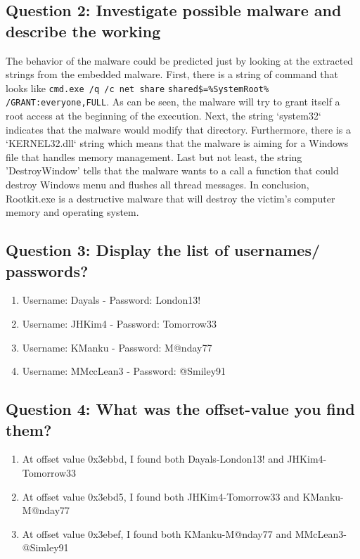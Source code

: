 \documentclass[letterpaper,10pt,titlepage,draftclsnofoot,onecolumn]{IEEEtran}
\begin{document}
\subsection{Question 2: Investigate possible malware and describe the working}

The behavior of the malware could be predicted just by looking at the extracted strings from the embedded malware.
First, there is a string of command that looks like \verb|cmd.exe /q /c net share| \verb|shared$=%SystemRoot% /GRANT:everyone,FULL|. 
As can be seen, the malware will try to grant itself a root access at the beginning of the execution. 
Next, the string `system32` indicates that the malware would modify that directory. 
Furthermore, there is a `KERNEL32.dll` string which means that the malware is aiming for a Windows file that handles memory management.
Last but not least, the string 'DestroyWindow' tells that the malware wants to a call a function that could destroy Windows menu and flushes all thread messages.
In conclusion, Rootkit.exe is a destructive malware that will destroy the victim's computer memory and operating system.

\subsection{Question 3: Display the list of usernames/ passwords?}

\begin{enumerate}
\item Username: Dayals - Password: London13!
\item Username: JHKim4 - Password: Tomorrow33
\item Username: KManku - Password: M@nday77
\item Username: MMccLean3 - Password: @Smiley91
\end{enumerate}

\subsection{Question 4: What was the offset-value you find them?}

\begin{enumerate}  
\item At offset value 0x3ebbd, I found both Dayals-London13! and JHKim4-Tomorrow33
\item At offset value 0x3ebd5, I found both JHKim4-Tomorrow33 and KManku-M@nday77
\item At offset value 0x3ebef, I found both KManku-M@nday77 and MMcLean3-@Simley91
\end{enumerate}
\end{document}
